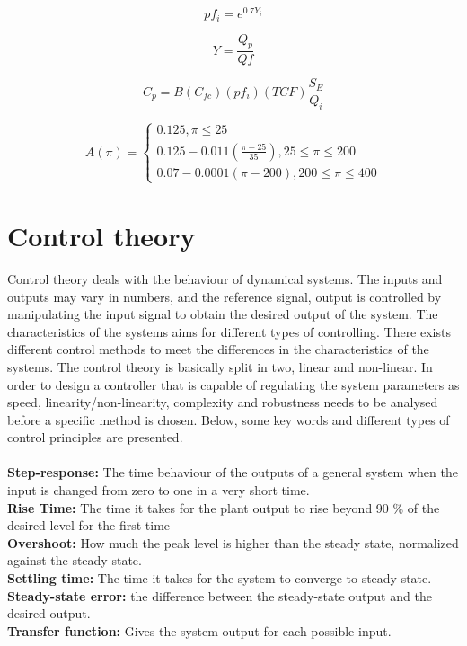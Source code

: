 \begin{equation}
\label{eq:polfac}
pf_{i} = e^{0.7Y_{i}}
\end{equation}

\begin{equation}
\label{eq:recov}
Y= \frac{Q_{p}}{Q{f}}
\end{equation}

\begin{equation}
\label{eq:permC}
C_{p}=B(C_{fc})({pf_{i}})(TCF)\frac{S_{E}}{Q_{i}}
\end{equation}

\begin{equation}
\label{eq:permability}
A(\pi) =
\begin{cases} 
0.125 , \pi \leq 25 \\
0.125-0.011(\frac{\pi - 25}{35}) , 25 \leq \pi \leq 200 \\ 
0.07-0.0001(\pi-200) , 200 \leq \pi \leq 400  
\end{cases}
\end{equation}

\section{Control theory}
Control theory deals with the behaviour of dynamical systems. The inputs and outputs may vary in numbers, and the reference signal, output is controlled by manipulating the input signal to obtain the desired output of the system. The characteristics of the systems aims for different types of controlling. There exists different control methods to meet the differences in the characteristics of the systems. The control theory is basically split in two, linear and non-linear. In order to design a controller that is capable of regulating the system parameters as speed, linearity/non-linearity, complexity and robustness needs to be analysed before a specific method is chosen. Below, some key words and different types of control principles are presented. \\
\\
\textbf{Step-response:} The time behaviour of the outputs of a general system when the input is changed from zero to one in a very short time. \\
\textbf{Rise Time:} The time it takes for the plant output to rise beyond 90 \% of the desired level for the first time\\
\textbf{Overshoot:} How much the peak level is higher than the steady state, normalized against the steady state.\\ \textbf{Settling time:} The time it takes for the system to converge to steady state.\\
\textbf{Steady-state error:} the difference between the steady-state output and the desired output.\\
\textbf{Transfer function:} Gives the system output for each possible input.\\

